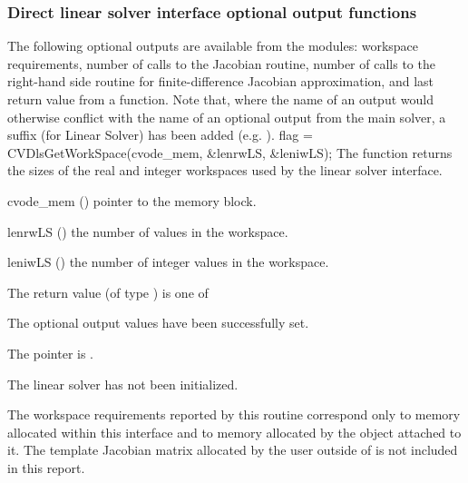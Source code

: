 \subsubsection{Direct linear solver interface optional output functions}
\label{sss:optout_dls}
The following optional outputs are available from the {\cvdls} modules:
workspace requirements, number of calls to the Jacobian routine, number of
calls to the right-hand side routine for finite-difference Jacobian approximation,
and last return value from a {\cvdls} function.
Note that, where the name of an output would otherwise conflict with
the name of an optional output from the main solver, a suffix 
(for Linear Solver) has been added (e.g. ).
{
  flag = CVDlsGetWorkSpace(cvode\_mem, \&lenrwLS, \&leniwLS);
}
{
  The function  returns the sizes of the real and
  integer workspaces used by the {\cvdls} linear solver interface.
}
{
  \begin{args}
  \item[cvode\_mem] ()
    pointer to the {\cvode} memory block.
  \item[lenrwLS] ()
    the number of  values in the {\cvdls} workspace.
  \item[leniwLS] ()
    the number of integer values in the {\cvdls} workspace.
  \end{args}
}
{
  The return value  (of type ) is one of
  \begin{args}
  \item[\Id{CVDLS\_SUCCESS}]
    The optional output values have been successfully set.
  \item[\Id{CVDLS\_MEM\_NULL}]
    The  pointer is .
  \item[\Id{CVDLS\_LMEM\_NULL}]
    The {\cvdls} linear solver has not been initialized.
  \end{args}
}
{
  The workspace requirements reported by this routine correspond only
  to memory allocated within this interface and to memory allocated by
  the {\sunlinsol} object attached to it.  The template Jacobian
  matrix allocated by the user outside of {\cvdls} is not included in
  this report.
}
